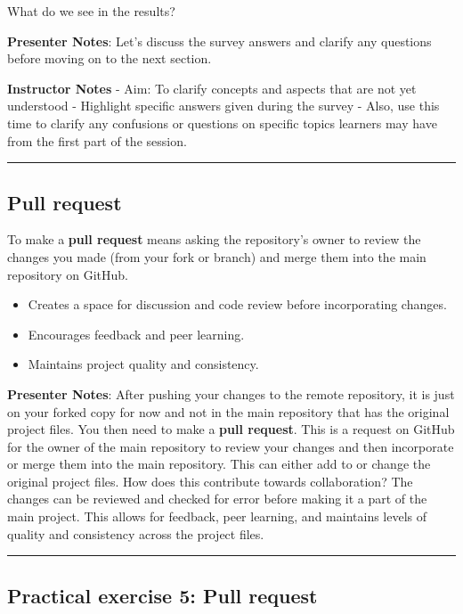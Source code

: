 \documentclass[
  letterpaper,
  DIV=11,
  numbers=noendperiod]{scrartcl}
\providecommand{\tightlist}{%
  \setlength{\itemsep}{0pt}\setlength{\parskip}{0pt}}
\begin{document}
What do we see in the results?

\textbf{Presenter Notes}: Let's discuss the survey answers and clarify
any questions before moving on to the next section.

\textbf{Instructor Notes} - Aim: To clarify concepts and aspects that
are not yet understood - Highlight specific answers given during the
survey - Also, use this time to clarify any confusions or questions on
specific topics learners may have from the first part of the session.

\begin{center}\rule{0.5\linewidth}{0.5pt}\end{center}

\subsection{Pull request}\label{pull-request}

To make a \textbf{pull request} means asking the repository's owner to
review the changes you made (from your fork or branch) and merge them
into the main repository on GitHub.

\begin{itemize}
\tightlist
\item
  Creates a space for discussion and code review before incorporating
  changes.
\item
  Encourages feedback and peer learning.
\item
  Maintains project quality and consistency.
\end{itemize}

\textbf{Presenter Notes}: After pushing your changes to the remote
repository, it is just on your forked copy for now and not in the main
repository that has the original project files. You then need to make a
\textbf{pull request}. This is a request on GitHub for the owner of the
main repository to review your changes and then incorporate or merge
them into the main repository. This can either add to or change the
original project files. How does this contribute towards collaboration?
The changes can be reviewed and checked for error before making it a
part of the main project. This allows for feedback, peer learning, and
maintains levels of quality and consistency across the project files.

\begin{center}\rule{0.5\linewidth}{0.5pt}\end{center}

\subsection{Practical exercise 5: Pull
request}\label{practical-exercise-5-pull-request}
\end{document}
